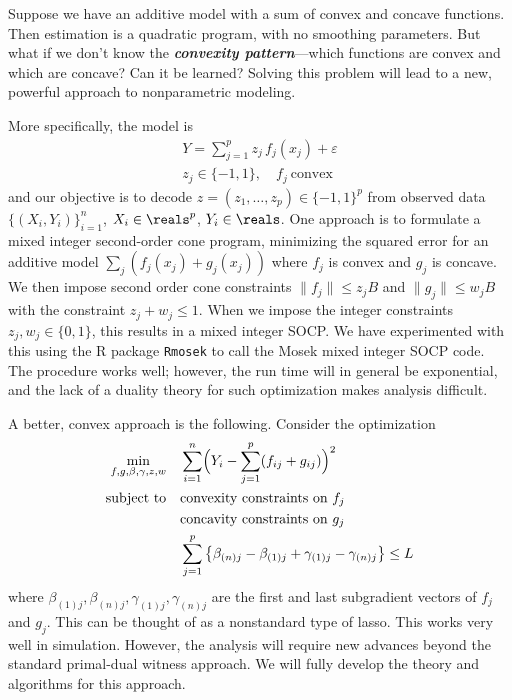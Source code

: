 Suppose we have an additive model with a sum of 
convex and concave functions.
Then estimation is a quadratic program, with no smoothing parameters.
But what if we don't know the {\it\bfseries convexity pattern}---which
  functions are convex and which are concave?  Can it be learned?
Solving this problem will lead to a new, powerful approach
to nonparametric modeling.

More specifically, the model is
\begin{gather*}
Y = \sum_{j=1}^p z_j\, f_j(x_j)  + \varepsilon \\
z_j\in \{-1, 1\}, \quad f_j\ \text{convex}
\end{gather*}
and our objective is to decode
$z = (z_1,\ldots, z_p) \in \{-1, 1\}^p$ from observed data
$\{(X_i, Y_i)\}_{i=1}^n$, $X_i\in\reals^p$, $Y_i\in\reals$.
One approach is to formulate a mixed integer second-order cone program,
minimizing the squared error for an additive model $\sum_j (f_j(x_j) +
g_j(x_j))$
where $f_j$ is convex and $g_j$ is concave.  We then impose
second order cone constraints $\|f_j\| \leq z_jB$ and 
$\|g_j\| \leq w_jB$ with the constraint $z_j + w_j \leq 1$.  When
we impose the integer constraints $z_j, w_j \in \{0,1\}$, this
results in a mixed integer SOCP.    
We have experimented with this using the R package \texttt{Rmosek} to
call the Mosek mixed integer SOCP code.  The procedure works well; however,
the run time will in general be exponential, and
the lack of a duality theory for such optimization makes analysis difficult.

A better, convex approach is the following.  Consider the optimization
\begin{align*}
\min_{f,g,\beta,\gamma,z,w}\quad & \sum_{i=1}^n \Bigl(Y_i - \sum_{j=1}^p (f_{ij}+g_{ij})\Bigr)^2 \\
\text{subject to}\quad 
  & \text{convexity constraints on $f_{j}$} \\
  & \text{concavity constraints on $g_{j}$} \\
  & \sum_{j=1}^p \left\{\beta_{(n)j} - \beta_{(1)j} + \gamma_{(1)j} -
  \gamma_{(n)j}\right\} \leq L
\end{align*}
where $\beta_{(1)j}, \beta_{(n)j}, \gamma_{(1)j}, \gamma_{(n)j}$ are
the first and last subgradient vectors of $f_j$ and $g_j$.
This can be thought of as a nonstandard type of lasso.  
This works very well in simulation.  However, the analysis
will require new advances beyond the standard primal-dual witness
approach. We will fully develop the theory and algorithms for this approach.



